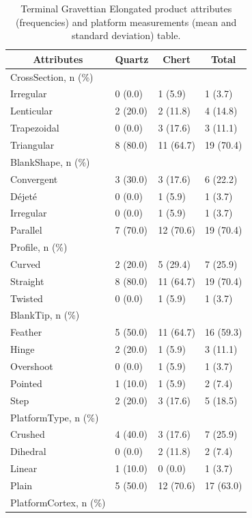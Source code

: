 \documentclass[12pt,twoside]{reedthesis}
\begin{document}
\begin{longtable}[t]{llll}
\caption{\label{tab:unnamed-chunk-77}Terminal Gravettian Elongated product attributes (frequencies) and platform measurements (mean and standard deviation) table.}\\
\toprule
\multicolumn{1}{c}{\textbf{Attributes}} & \multicolumn{1}{c}{\textbf{Quartz}} & \multicolumn{1}{c}{\textbf{Chert}} & \multicolumn{1}{c}{\textbf{Total}}\\
\midrule
CrossSection, n (\%) &  &  & \\
Irregular & 0 (0.0) & 1 (5.9) & 1 \vphantom{1} (3.7)\\
Lenticular & 2 (20.0) & 2 (11.8) & 4 (14.8)\\
Trapezoidal & 0 (0.0) & 3 (17.6) & 3 (11.1)\\
Triangular & 8 (80.0) & 11 (64.7) & 19 (70.4)\\
\addlinespace
BlankShape, n (\%) &  &  & \\
Convergent & 3 (30.0) & 3 (17.6) & 6 (22.2)\\
Déjeté & 0 (0.0) & 1 (5.9) & 1 (3.7)\\
Irregular & 0 (0.0) & 1 (5.9) & 1 (3.7)\\
Parallel & 7 (70.0) & 12 (70.6) & 19 (70.4)\\
\addlinespace
Profile, n (\%) &  &  & \\
Curved & 2 (20.0) & 5 (29.4) & 7 (25.9)\\
Straight & 8 (80.0) & 11 (64.7) & 19 (70.4)\\
Twisted & 0 (0.0) & 1 (5.9) & 1 (3.7)\\
BlankTip, n (\%) &  &  & \\
\addlinespace
Feather & 5 (50.0) & 11 (64.7) & 16 (59.3)\\
Hinge & 2 (20.0) & 1 (5.9) & 3 (11.1)\\
Overshoot & 0 (0.0) & 1 (5.9) & 1 (3.7)\\
Pointed & 1 (10.0) & 1 (5.9) & 2 (7.4)\\
Step & 2 (20.0) & 3 (17.6) & 5 (18.5)\\
\addlinespace
PlatformType, n (\%) &  &  & \\
Crushed & 4 (40.0) & 3 (17.6) & 7 (25.9)\\
Dihedral & 0 (0.0) & 2 (11.8) & 2 (7.4)\\
Linear & 1 (10.0) & 0 (0.0) & 1 (3.7)\\
Plain & 5 (50.0) & 12 (70.6) & 17 (63.0)\\
\addlinespace
PlatformCortex, n (\%) &  &  & \\

\end{longtable}
\end{document}
